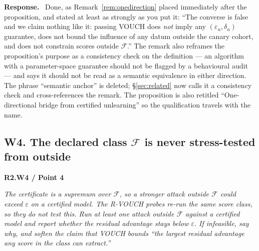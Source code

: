 \documentclass[11pt,a4paper]{article}
\newcommand{\eps}{\varepsilon}
\newcommand{\F}{\mathcal{F}}
\newenvironment{point}[1]{%
  \par\medskip\noindent\textbf{\color{rcol}#1}\par\nopagebreak\smallskip\begingroup
  \color{rcol}\itshape}{\endgroup\par}
\newenvironment{reply}{%
  \par\smallskip\noindent\textbf{\color{acol}Response.}\ \begingroup}{\endgroup\par}
\begin{document}
\begin{reply}
Done, as Remark~\ref{rem:onedirection} placed immediately after the proposition, and stated at least as
strongly as you put it: ``The converse is false and we claim nothing like it: passing
VOUCH does \emph{not} imply any $(\eps_u,\delta_u)$ guarantee, does not bound the
influence of any datum outside the canary cohort, and does not constrain scores outside
$\F$.'' The remark also reframes the proposition's purpose as a consistency check on
the definition --- an algorithm with a parameter-space guarantee should not be flagged by
a behavioural audit --- and says it should not be read as a semantic equivalence in
either direction. The phrase ``semantic anchor'' is deleted; \S\ref{sec:related} now calls it a
consistency check and cross-references the remark. The proposition is also retitled
``One-directional bridge from certified unlearning'' so the qualification travels with
the name.
\end{reply}

\subsection*{W4. The declared class $\F$ is never stress-tested from outside}

\begin{point}{R2.W4 / Point 4}
The certificate is a supremum over $\F$, so a stronger attack outside $\F$ could exceed
$\eps$ on a certified model. The R-VOUCH probes re-run the same score class, so they do
not test this. Run at least one attack outside $\F$ against a certified model and report
whether the residual advantage stays below $\eps$. If infeasible, say why, and soften
the claim that VOUCH bounds ``the largest residual advantage any score in the class can
extract.''
\end{point}
\end{document}
